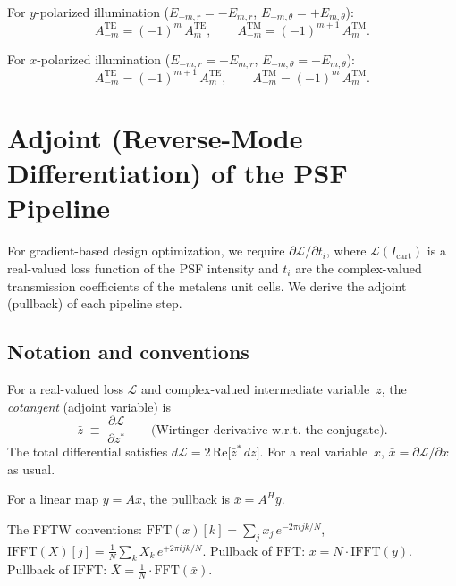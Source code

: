 \documentclass[11pt,a4paper]{article}
\begin{document}
For $y$-polarized illumination ($E_{-m,r} = -E_{m,r}$, $E_{-m,\theta} = +E_{m,\theta}$):
\begin{equation}\label{eq:sym_ypol}
  A^{\mathrm{TE}}_{-m} = (-1)^{m}\,A^{\mathrm{TE}}_m, \qquad
  A^{\mathrm{TM}}_{-m} = (-1)^{m+1}\,A^{\mathrm{TM}}_m.
\end{equation}

For $x$-polarized illumination ($E_{-m,r} = +E_{m,r}$, $E_{-m,\theta} = -E_{m,\theta}$):
\begin{equation}\label{eq:sym_xpol}
  A^{\mathrm{TE}}_{-m} = (-1)^{m+1}\,A^{\mathrm{TE}}_m, \qquad
  A^{\mathrm{TM}}_{-m} = (-1)^{m}\,A^{\mathrm{TM}}_m.
\end{equation}


\section{Adjoint (Reverse-Mode Differentiation) of the PSF Pipeline}
\label{sec:adjoint}

For gradient-based design optimization, we require $\partial\mathcal{L}/\partial t_i$,
where $\mathcal{L}(I_{\mathrm{cart}})$ is a real-valued loss function of the PSF
intensity and $t_i$ are the complex-valued transmission coefficients of the metalens
unit cells.  We derive the adjoint (pullback) of each pipeline step.

\subsection{Notation and conventions}

For a real-valued loss $\mathcal{L}$ and complex-valued intermediate variable~$z$,
the \emph{cotangent} (adjoint variable) is
\begin{equation}
  \bar z \;\equiv\; \frac{\partial\mathcal{L}}{\partial z^*}
  \qquad\text{(Wirtinger derivative w.r.t.\ the conjugate)}.
\end{equation}
The total differential satisfies
$d\mathcal{L} = 2\,\mathrm{Re}\bigl[\bar z^*\,dz\bigr]$.
For a real variable~$x$, $\bar x = \partial\mathcal{L}/\partial x$ as usual.

For a linear map $y = Ax$, the pullback is $\bar x = A^H \bar y$.

The FFTW conventions: $\mathrm{FFT}(x)[k] = \sum_j x_j\,e^{-2\pi i jk/N}$,\;
$\mathrm{IFFT}(X)[j] = \tfrac{1}{N}\sum_k X_k\,e^{+2\pi ijk/N}$.
Pullback of $\mathrm{FFT}$: $\bar x = N\cdot\mathrm{IFFT}(\bar y)$.
Pullback of $\mathrm{IFFT}$: $\bar X = \tfrac{1}{N}\cdot\mathrm{FFT}(\bar x)$.
\end{document}

